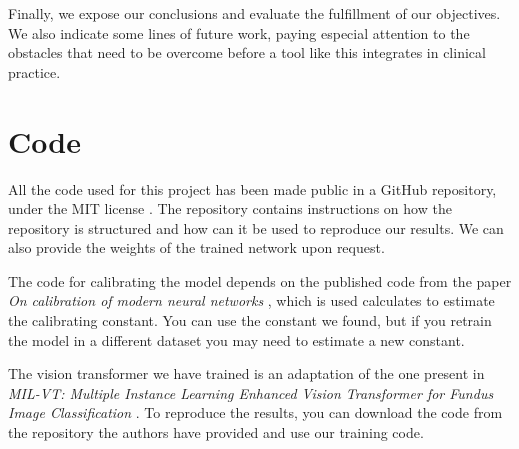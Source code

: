 Finally, we expose our conclusions and evaluate the fulfillment of our objectives. We also indicate some lines of future work, paying especial attention to the obstacles that need to be overcome before a tool like this integrates in clinical practice.

\section{Code}
All the code used for this project has been made public in a GitHub repository, under the MIT license \cite{codeused}. The repository contains instructions on how the repository is structured and how can it be used to reproduce our results. We can also provide the weights of the trained network upon request.

The code for calibrating the model depends on the published code from the paper \textit{On calibration of modern neural networks} \cite{guo2017calibration}, which is used calculates to estimate the calibrating constant. You can use the constant we found, but if you retrain the model in a different dataset you may need to estimate a new constant.

The vision transformer we have trained is an adaptation of the one present in \textit{MIL-VT: Multiple Instance Learning Enhanced Vision Transformer for Fundus Image Classification} \cite{suang2021milvt}. To reproduce the results, you can download the code from the repository the authors have provided and use our training code.